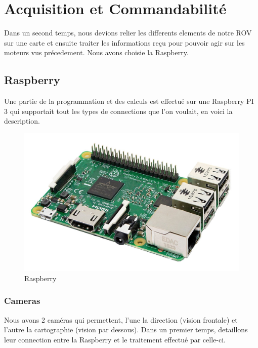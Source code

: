 \documentclass[a4paper,11pt]{report}
\begin{document}
\chapter{Acquisition et Commandabilité}
	
	Dans un second temps, nous devions relier les differents elements de notre ROV sur une carte et ensuite traiter les informations reçu pour pouvoir agir sur les moteurs vus précedement. Nous avons choisie la Raspberry.
	
	\section{Raspberry}
		Une partie de la programmation et des calculs est effectué sur une Raspberry PI 3 qui supportait tout les types de connections que l'on voulait, en voici la description.
			\begin{figure}[!h]
					\begin{center}
						\includegraphics[scale=0.2]{Photos/Raspberry.jpg}
						\caption{Raspberry}
					\end{center}
				\end{figure}
				
		\subsection{Cameras}
			Nous avons 2 caméras qui permettent, l'une la direction (vision frontale) et l'autre la cartographie (vision par dessous). Dans un premier temps, detaillons leur connection entre la Raspberry et le traitement effectué par celle-ci.
			
\end{document}
